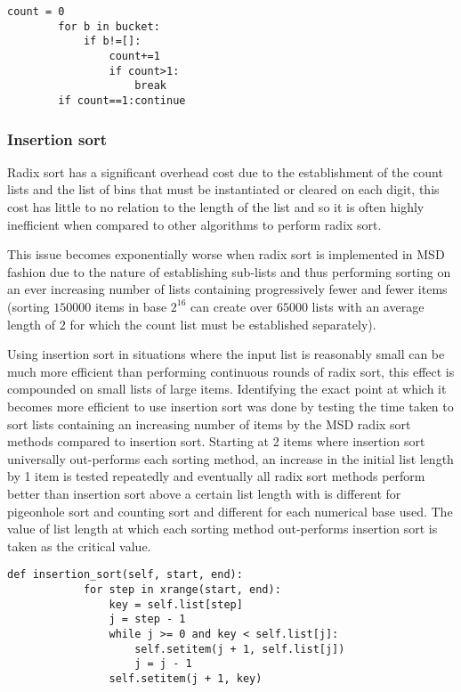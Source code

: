\documentclass[12pt]{article}
\begin{document}
\begin{table}[H]
	\centering
	\begin{lstlisting}[caption={Identifying if more than 1 bucket has been used},captionpos=b]
		count = 0
		for b in bucket:
			if b!=[]:
				count+=1
				if count>1:
					break
		if count==1:continue
	\end{lstlisting}
\end{table}


\subsubsection{Insertion sort}
\label{sssec:insertionoptimization}
Radix sort has a significant overhead cost due to the establishment of the count lists and the list of bins that must be instantiated or cleared on each digit, this cost has little to no relation to the length of the list and so it is often highly inefficient when compared to other algorithms to perform radix sort.
\par
This issue becomes exponentially worse when radix sort is implemented in MSD fashion due to the nature of establishing sub-lists and thus performing sorting on an ever increasing number of lists containing progressively fewer and fewer items (sorting $150000$ items in base $2^{16}$ can create over $65000$ lists with an average length of $2$ for which the count list must be established separately).
\par
Using insertion sort in situations where the input list is reasonably small can be much more efficient than performing continuous rounds of radix sort, this effect is compounded on small lists of large items. Identifying the exact point at which it becomes more efficient to use insertion sort was done by testing the time taken to sort lists containing an increasing number of items by the MSD radix sort methods compared to insertion sort. Starting at 2 items where insertion sort universally out-performs each sorting method, an increase in the initial list length by 1 item is tested repeatedly and eventually all radix sort methods perform better than insertion sort above a certain list length with is different for pigeonhole sort and counting sort and different for each numerical base used. The value of list length at which each sorting method out-performs insertion sort is taken as the critical value. 
\begin{table}[H]
	\centering
	\begin{lstlisting}[caption={Insertion sort algorithm used in this project},captionpos=b]
        def insertion_sort(self, start, end):
            for step in xrange(start, end):
                key = self.list[step]
                j = step - 1
                while j >= 0 and key < self.list[j]:
                    self.setitem(j + 1, self.list[j])
                    j = j - 1
                self.setitem(j + 1, key)
	\end{lstlisting}
\end{table}
\end{document}
